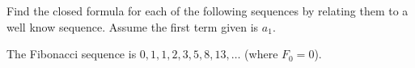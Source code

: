 \begin{questions}

\question Find the closed formula for each of the following sequences by relating them to a well know sequence.  Assume the first term given is $a_1$.

	\begin{answer}
	\end{answer}
	
	
	

\question The Fibonacci sequence is $0, 1, 1, 2, 3, 5, 8, 13, \ldots$ (where $F_0 = 0$).
\begin{parts}

\end{parts}
\end{questions}
